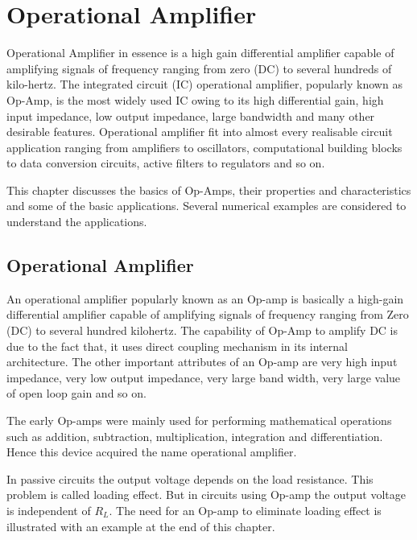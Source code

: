 \chapter{Operational Amplifier}\label{chap5}

Operational Amplifier in essence is a high gain differential amplifier capable of amplifying signals of frequency ranging from zero (DC) to several hundreds of  kilo-hertz. The integrated circuit (IC) operational amplifier, popularly known as Op-Amp, is the most widely used IC owing to its high differential gain, high input impedance, low output impedance, large bandwidth and many other desirable features. Operational amplifier fit into almost every realisable circuit application ranging from amplifiers to oscillators, computational building blocks to data conversion circuits, active filters to regulators and so on. 

This chapter discusses the basics of Op-Amps, their properties and characteristics and some of the basic applications. Several numerical examples are considered to understand the applications.

\section{Operational Amplifier}\label{sec5.1}

An operational amplifier popularly known as an Op-amp is basically a high-gain differential amplifier capable of amplifying signals of frequency ranging from Zero (DC) to several hundred kilohertz. The capability of Op-Amp to amplify DC is due to the fact that, it uses direct coupling mechanism in its internal architecture. The other important attributes of an Op-amp are very high input impedance, very low output impedance, very large band width, very large value of open loop gain and so on.

The early Op-amps were mainly used for performing mathematical operations such as addition, subtraction, multiplication, integration and differentiation. Hence this device acquired the name operational amplifier.

In passive circuits the output voltage depends on the load resistance. This problem is called loading effect. But in circuits using Op-amp the output voltage is independent of $R_{L}$. The need for an Op-amp to eliminate loading effect is illustrated with an example at the end of this chapter.

\newpage

